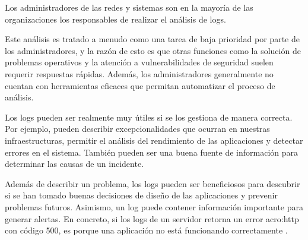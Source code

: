 Los administradores de las redes y sistemas son en la mayoría de las
organizaciones los responsables de realizar el análisis de logs.

Este análisis es tratado a menudo como una tarea de baja prioridad por parte de
los administradores, y la razón de esto es que otras funciones como la solución
de problemas operativos y la atención a vulnerabilidades de seguridad suelen
requerir respuestas rápidas. Además, los administradores generalmente no
cuentan con herramientas eficaces que permitan automatizar el proceso de
análisis.

Los logs pueden ser realmente muy útiles si se los gestiona de manera correcta.
Por ejemplo, pueden describir excepcionalidades que ocurran en nuestras
infraestructuras, permitir el análisis del rendimiento de las aplicaciones y
detectar errores en el sistema. También pueden ser una buena fuente de
información para determinar las causas de un incidente.

Además de describir un problema, los logs pueden ser beneficiosos para
descubrir si se han tomado buenas decisiones de diseño de las aplicaciones y
prevenir problemas futuros. Asimismo, un log puede contener información
importante para generar alertas. En concreto, si los logs de un servidor
 retorna un error \gls{acro:http} con código 500, es porque una
aplicación no está funcionando correctamente
\cite[p.~30-31]{monitoreo:logging_and_log_management}.
